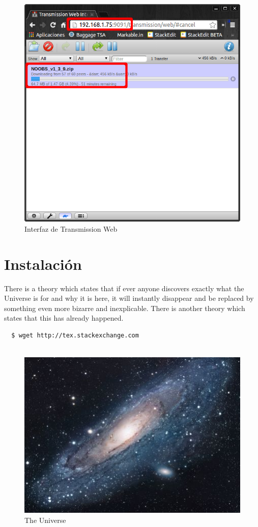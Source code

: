 \documentclass{article}
\begin{document}
\begin{figure}[h!]
\centering
\includegraphics[scale=0.5]{torrent20.png}
\caption{Interfaz de Transmission Web}
\label{fig:torrent1}
\end{figure}



\section{Instalación}
There is a theory which states that if ever anyone discovers exactly what the Universe is for and why it is here, it will instantly disappear and be replaced by something even more bizarre and inexplicable.
There is another theory which states that this has already happened.


\begin{verbatim}
  $ wget http://tex.stackexchange.com
  
\end{verbatim}

\begin{figure}[h!]
\centering
\includegraphics[scale=1.7]{universe.jpg}
\caption{The Universe}
\label{fig:univerise}
\end{figure}
\end{document}
